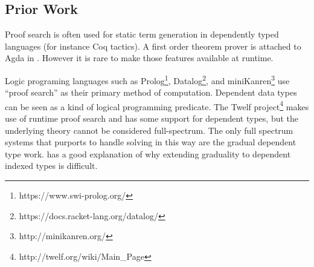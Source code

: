 \subsection{Prior Work}

Proof search is often used for static term generation in dependently typed languages (for instance Coq tactics).
A first order theorem prover is attached to Agda in \cite{norell2007towards}.
However it is rare to make those features available at runtime. 

Logic programing languages such as Prolog\footnote{https://www.swi-prolog.org/}, Datalog\footnote{https://docs.racket-lang.org/datalog/}, and miniKanren\footnote{http://minikanren.org/} use ``proof search'' as their primary method of computation.
Dependent data types can be seen as a kind of logical programming predicate.
The Twelf project\footnote{http://twelf.org/wiki/Main\_Page} makes use of runtime proof search and has some support for dependent types, but the underlying theory cannot be considered full-spectrum.
The only full spectrum systems that purports to handle solving in this way are the gradual dependent type work\cite{DBLP:journals/corr/abs-1906-06469}.
\cite{bertrand:hal-02896776} has a good explanation of why extending graduality to dependent indexed types is difficult.
